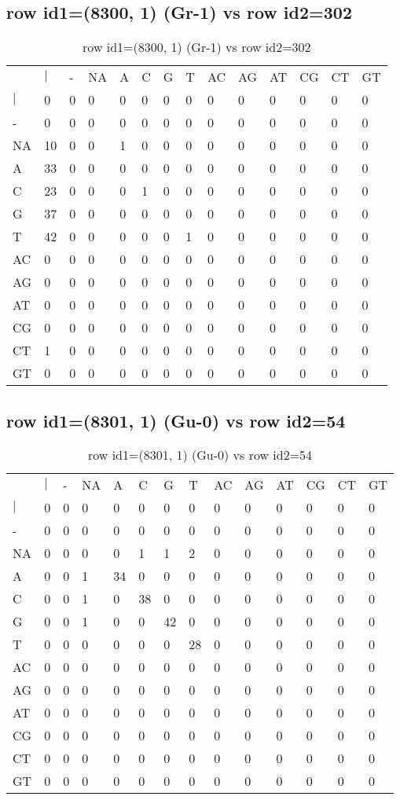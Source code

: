 \subsection{row id1=(8300, 1) (Gr-1) vs row id2=302}
\begin{center}
\begin{longtable}{|l|l|l|l|l|l|l|l|l|l|l|l|l|l|}
\caption{row id1=(8300, 1) (Gr-1) vs row id2=302} \label{table_dm474}\\
\hline
\\
\hline
&$|$&-&NA&A&C&G&T&AC&AG&AT&CG&CT&GT\\
$|$&0&0&0&0&0&0&0&0&0&0&0&0&0\\
-&0&0&0&0&0&0&0&0&0&0&0&0&0\\
NA&10&0&0&1&0&0&0&0&0&0&0&0&0\\
A&33&0&0&0&0&0&0&0&0&0&0&0&0\\
C&23&0&0&0&1&0&0&0&0&0&0&0&0\\
G&37&0&0&0&0&0&0&0&0&0&0&0&0\\
T&42&0&0&0&0&0&1&0&0&0&0&0&0\\
AC&0&0&0&0&0&0&0&0&0&0&0&0&0\\
AG&0&0&0&0&0&0&0&0&0&0&0&0&0\\
AT&0&0&0&0&0&0&0&0&0&0&0&0&0\\
CG&0&0&0&0&0&0&0&0&0&0&0&0&0\\
CT&1&0&0&0&0&0&0&0&0&0&0&0&0\\
GT&0&0&0&0&0&0&0&0&0&0&0&0&0\\
\hline
\end{longtable}
\end{center}

\subsection{row id1=(8301, 1) (Gu-0) vs row id2=54}
\begin{center}
\begin{longtable}{|l|l|l|l|l|l|l|l|l|l|l|l|l|l|}
\caption{row id1=(8301, 1) (Gu-0) vs row id2=54} \label{table_dm476}\\
\hline
\\
\hline
&$|$&-&NA&A&C&G&T&AC&AG&AT&CG&CT&GT\\
$|$&0&0&0&0&0&0&0&0&0&0&0&0&0\\
-&0&0&0&0&0&0&0&0&0&0&0&0&0\\
NA&0&0&0&0&1&1&2&0&0&0&0&0&0\\
A&0&0&1&34&0&0&0&0&0&0&0&0&0\\
C&0&0&1&0&38&0&0&0&0&0&0&0&0\\
G&0&0&1&0&0&42&0&0&0&0&0&0&0\\
T&0&0&0&0&0&0&28&0&0&0&0&0&0\\
AC&0&0&0&0&0&0&0&0&0&0&0&0&0\\
AG&0&0&0&0&0&0&0&0&0&0&0&0&0\\
AT&0&0&0&0&0&0&0&0&0&0&0&0&0\\
CG&0&0&0&0&0&0&0&0&0&0&0&0&0\\
CT&0&0&0&0&0&0&0&0&0&0&0&0&0\\
GT&0&0&0&0&0&0&0&0&0&0&0&0&0\\
\hline
\end{longtable}
\end{center}


